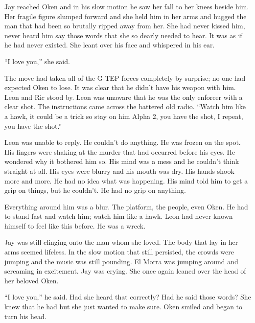 Jay reached Oken and in his slow motion he saw her fall to her knees beside him.  Her fragile figure slumped forward and she held him in her arms and hugged the man that had been so brutally ripped away from her.  She had never kissed him, never heard him say those words that she so dearly needed to hear.  It was as if he had never existed.  She leant over his face and whispered in his ear.

``I love you,'' she said.



\thoughtbreak



The move had taken all of the G-TEP forces completely by surprise; no one had expected Oken to lose.  It was clear that he didn't have his weapon with him.  Leon and Ric stood by.  Leon was unaware that he was the only enforcer with a clear shot.  The instructions came across the battered old radio.  ``Watch him like a hawk, it could be a trick so stay on him Alpha 2, you have the shot, I repeat, you have the shot.'' 

Leon was unable to reply.  He couldn't do anything.  He was frozen on the spot.  His fingers were shaking at the murder that had occurred before his eyes.  He wondered why it bothered him so.  His mind was a mess and he couldn't think straight at all.  His eyes were blurry and his mouth was dry.  His hands shook more and more.  He had no idea what was happening.  His mind told him to get a grip on things, but he couldn't.  He had no grip on anything.

Everything around him was a blur.  The platform, the people, even Oken.  He had to stand fast and watch him; watch him like a hawk.  Leon had never known himself to feel like this before.  He was a wreck.



\thoughtbreak



Jay was still clinging onto the man whom she loved.  The body that lay in her arms seemed lifeless.  In the slow motion that still persisted, the crowds were  jumping and the music was still pounding.  El Morra was jumping around and screaming in excitement.  Jay was crying.  She once again leaned over the head of her beloved Oken.

``I love you,'' he said.  Had she heard that correctly?  Had he said those words?  She knew that he had but she just wanted to make sure.  Oken smiled and began to turn his head.



